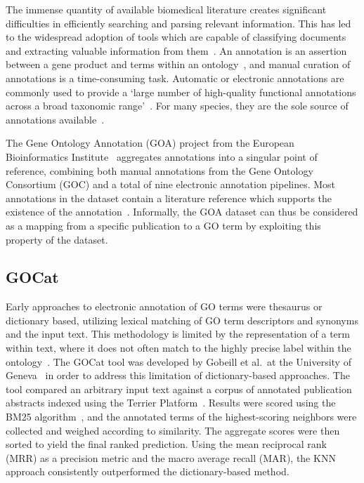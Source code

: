 \documentclass[11pt]{article}
\theoremstyle{plain}
\theoremstyle{definition}
\begin{document}
The immense quantity of available biomedical literature creates significant difficulties in efficiently searching and parsing relevant information. This has led to the widespread adoption of tools which are capable of classifying documents and extracting valuable information from them~\cite{hunter/2006/biomedical}.  An annotation is an assertion between a gene product and terms within an ontology~\cite{hill/2008/gene}, and manual curation of annotations is a time-consuming task. Automatic or electronic annotations are commonly used to provide a `large number of high-quality functional annotations across a broad taxonomic range'~\cite{huntley/2014/database}. For many species, they are the sole source of annotations available~\cite{huntley/2014/database}.

The Gene Ontology Annotation (GOA) project from the European Bioinformatics Institute~\cite{huntley/2014/database} aggregates annotations into a singular point of reference, combining both manual annotations from the Gene Ontology Consortium (GOC) and a total of nine electronic annotation pipelines. Most annotations in the dataset contain a literature reference which supports the existence of the annotation~\cite{hill/2008/gene}. Informally, the GOA dataset can thus be considered as a mapping from a specific publication to a GO term by exploiting this property of the dataset.

\subsection{GOCat}\label{sec:introduction-gocat}

Early approaches to electronic annotation of GO terms were thesaurus or dictionary based, utilizing lexical matching of GO term descriptors and synonyms and the input text. This methodology is limited by the representation of a term within text, where it does not often match to the highly precise label within the ontology~\cite{gobeill/2013/managing}. The GOCat tool was developed by Gobeill et al.\ at the University of Geneva~\cite{gobeill/2013/managing} in order to address this limitation of dictionary-based approaches. The tool compared an arbitrary input text against a corpus of annotated publication abstracts indexed using the Terrier Platform~\cite{ounis/2006/terrier}. Results were scored using the BM25 algorithm~\cite{amati/2009/bm}, and the annotated terms of the highest-scoring neighbors were collected and weighed according to similarity. The aggregate scores were then sorted to yield the final ranked prediction. Using the mean reciprocal rank (MRR) as a precision metric and the macro average recall (MAR), the KNN approach consistently outperformed the dictionary-based method.
\end{document}

